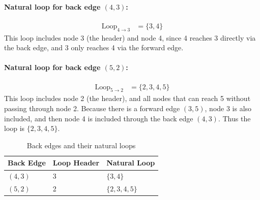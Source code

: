 \paragraph{Natural loop for back edge $(4, 3)$:}
\begin{align*}
\text{Loop}_{4 \to 3} &= \{3, 4\}
\end{align*}
This loop includes node 3 (the header) and node 4, since 4 reaches 3 directly via the back edge, and 3 only reaches 4 via the forward edge.

\paragraph{Natural loop for back edge $(5, 2)$:}
\begin{align*}
\text{Loop}_{5 \to 2} &= \{2, 3, 4, 5\}
\end{align*}
This loop includes node 2 (the header), and all nodes that can reach 5 without passing through node 2. Because there is a forward edge $(3, 5)$, node 3 is also included, and then node 4 is included through the back edge $(4, 3)$. Thus the loop is $\{2, 3, 4, 5\}$.



\begin{table}[h]
\centering
\begin{tabular}{|l|l|l|}
\hline
\textbf{Back Edge} & \textbf{Loop Header} & \textbf{Natural Loop} \\
\hline
$(4, 3)$ & 3 & $\{3, 4\}$ \\
\hline
$(5, 2)$ & 2 & $\{2, 3, 4, 5\}$ \\
\hline
\end{tabular}
\caption{Back edges and their natural loops}
\end{table}